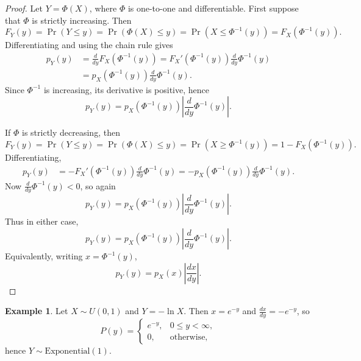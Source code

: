 \documentclass[11pt, titlepage]{article} %
\numberwithin{equation}{section}
\theoremstyle{definition}
\newtheorem*{example*}{Example}
\numberwithin{assumption}{section}
\begin{document}
\begin{proof}
Let $Y=\Phi(X)$, where $\Phi$ is one-to-one and differentiable. First suppose that $\Phi$ is strictly increasing. Then
\begin{equation*}
    F_Y(y)=\Pr(Y\le y)=\Pr(\Phi(X)\le y)=\Pr(X\le \Phi^{-1}(y))=F_X(\Phi^{-1}(y)).
\end{equation*}
Differentiating and using the chain rule gives
\begin{align*}
    p_Y(y)
    &=\frac{d}{dy}F_X(\Phi^{-1}(y))
    =F_X'(\Phi^{-1}(y))\frac{d}{dy}\Phi^{-1}(y)\\
    &=p_X(\Phi^{-1}(y))\frac{d}{dy}\Phi^{-1}(y).
\end{align*}
Since $\Phi^{-1}$ is increasing, its derivative is positive, hence
\begin{equation*}
    p_Y(y)=p_X(\Phi^{-1}(y))\left|\frac{d}{dy}\Phi^{-1}(y)\right|.
\end{equation*}

If $\Phi$ is strictly decreasing, then
\begin{equation*}
    F_Y(y)=\Pr(Y\le y)=\Pr(\Phi(X)\le y)=\Pr(X\ge \Phi^{-1}(y))=1-F_X(\Phi^{-1}(y)).
\end{equation*}
Differentiating,
\begin{align*}
    p_Y(y)
    &=-F_X'(\Phi^{-1}(y))\frac{d}{dy}\Phi^{-1}(y)
    =-p_X(\Phi^{-1}(y))\frac{d}{dy}\Phi^{-1}(y).
\end{align*}
Now $\frac{d}{dy}\Phi^{-1}(y)<0$, so again
\begin{equation*}
    p_Y(y)=p_X(\Phi^{-1}(y))\left|\frac{d}{dy}\Phi^{-1}(y)\right|.
\end{equation*}
Thus in either case,
\begin{equation*}
    p_Y(y)=p_X(\Phi^{-1}(y))\left|\frac{d}{dy}\Phi^{-1}(y)\right|.
\end{equation*}
Equivalently, writing $x=\Phi^{-1}(y)$,
\begin{equation*}
    p_Y(y)=p_X(x)\left|\frac{dx}{dy}\right|.
\end{equation*}
\end{proof}

\begin{example*}
Let $X\sim U(0,1)$ and $Y=-\ln X$. Then $x=e^{-y}$ and $\frac{dx}{dy}=-e^{-y}$, so
\begin{equation*}
    P(y)=
    \begin{cases}
        e^{-y}, & 0\le y<\infty,\\
        0, & \text{otherwise},
    \end{cases}
\end{equation*}
hence $Y\sim \mathrm{Exponential}(1)$.
\end{example*}
\end{document}

